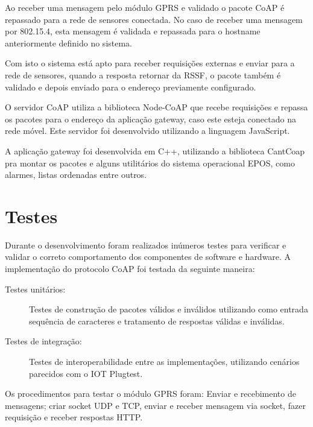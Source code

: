 Ao receber uma mensagem pelo m\'odulo GPRS e validado o pacote CoAP \'e repassado para a rede de sensores conectada.  No caso de receber uma mensagem por 802.15.4, esta mensagem \'e validada e repassada para o hostname anteriormente definido no sistema.

Com isto o sistema est\'a apto para receber requisi\c{c}\~oes externas e enviar para a rede de sensores, quando a resposta retornar da RSSF, o pacote tamb\'em \'e validado e depois enviado para o endere\c{c}o previamente configurado.

O servidor CoAP utiliza a biblioteca Node-CoAP que recebe requisi\c{c}\~oes e repassa os pacotes para o endere\c{c}o da aplica\c{c}\~ao gateway, caso este esteja conectado na rede m\'ovel. Este servidor foi desenvolvido utilizando a linguagem JavaScript.

A aplica\c{c}\~ao gateway foi desenvolvida em C++, utilizando a biblioteca CantCoap pra montar os pacotes e alguns utilit\'arios do sistema operacional EPOS, como alarmes, listas ordenadas entre outros.

\section{Testes}
Durante o desenvolvimento foram realizados in\'umeros testes para verificar e validar o correto comportamento dos componentes de software e hardware.  A implementa\c{c}\~ao do protocolo CoAP foi testada da seguinte maneira:

\begin{description}
    \item[Testes unit\'arios:] Testes de constru\c{c}\~ao de pacotes v\'alidos e inv\'alidos utilizando como entrada sequ\^encia de caracteres e tratamento de respostas v\'alidas e inv\'alidas.
    \item[Testes de integra\c{c}\~ao:] Testes de interoperabilidade entre as implementa\c{c}\~oes, utilizando cen\'arios parecidos com o IOT Plugtest.
\end{description}

Os procedimentos para testar o m\'odulo GPRS foram: Enviar e recebimento de mensagens; criar socket UDP e TCP, enviar e receber mensagem via socket, fazer requisi\c{c}\~ao e receber respostas HTTP.
